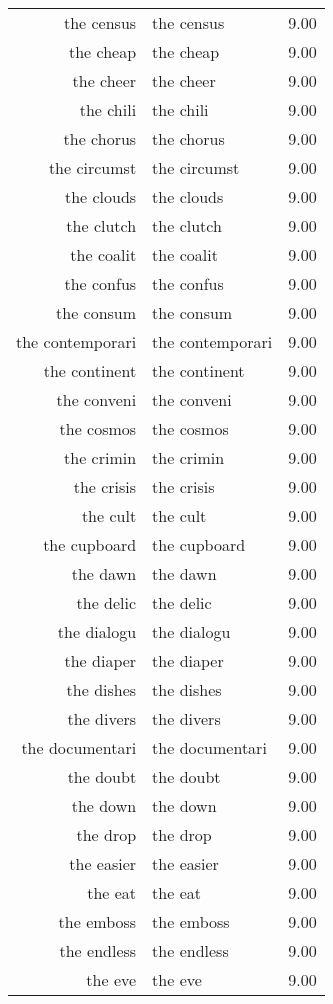 \begin{table}[ht]
\begin{tabular}{rlr}
  the census & the census & 9.00 \\ 
  the cheap & the cheap & 9.00 \\ 
  the cheer & the cheer & 9.00 \\ 
  the chili & the chili & 9.00 \\ 
  the chorus & the chorus & 9.00 \\ 
  the circumst & the circumst & 9.00 \\ 
  the clouds & the clouds & 9.00 \\ 
  the clutch & the clutch & 9.00 \\ 
  the coalit & the coalit & 9.00 \\ 
  the confus & the confus & 9.00 \\ 
  the consum & the consum & 9.00 \\ 
  the contemporari & the contemporari & 9.00 \\ 
  the continent & the continent & 9.00 \\ 
  the conveni & the conveni & 9.00 \\ 
  the cosmos & the cosmos & 9.00 \\ 
  the crimin & the crimin & 9.00 \\ 
  the crisis & the crisis & 9.00 \\ 
  the cult & the cult & 9.00 \\ 
  the cupboard & the cupboard & 9.00 \\ 
  the dawn & the dawn & 9.00 \\ 
  the delic & the delic & 9.00 \\ 
  the dialogu & the dialogu & 9.00 \\ 
  the diaper & the diaper & 9.00 \\ 
  the dishes & the dishes & 9.00 \\ 
  the divers & the divers & 9.00 \\ 
  the documentari & the documentari & 9.00 \\ 
  the doubt & the doubt & 9.00 \\ 
  the down & the down & 9.00 \\ 
  the drop & the drop & 9.00 \\ 
  the easier & the easier & 9.00 \\ 
  the eat & the eat & 9.00 \\ 
  the emboss & the emboss & 9.00 \\ 
  the endless & the endless & 9.00 \\ 
  the eve & the eve & 9.00 \\ 

\end{tabular}
\end{table}
